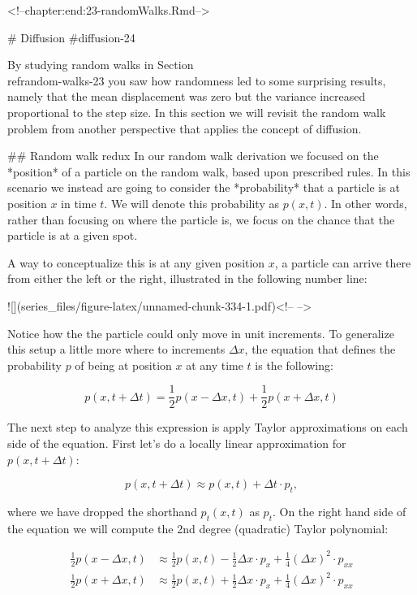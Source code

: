 \documentclass[
]{book}
\theoremstyle{definition}
\theoremstyle{definition}
\theoremstyle{definition}
\theoremstyle{remark}
\begin{document}
<!--chapter:end:23-randomWalks.Rmd-->

# Diffusion {#diffusion-24}

By studying random walks in Section \\ref{random-walks-23} you saw how randomness led to some surprising results, namely that the mean displacement was zero but the variance increased proportional to the step size.  In this section we will revisit the random walk problem from another perspective that applies the concept of diffusion.

## Random walk redux
In our random walk derivation we focused on the *position* of a particle on the random walk, based upon prescribed rules.  In this scenario we instead are going to consider the *probability* that a particle is at position $x$ in time $t$. We will denote this probability as $p(x,t)$. In other words, rather than focusing on where the particle is, we focus on the chance that the particle is at a given spot.

A way to conceptualize this is at any given position $x$, a particle can arrive there from either the left or the right, illustrated in the following number line:

![](series_files/figure-latex/unnamed-chunk-334-1.pdf)<!-- --> 

Notice how the the particle could only move in unit increments. To generalize this setup a little more where to increments $\Delta x$, the equation that defines the probability $p$ of being at position $x$ at any time $t$ is the following:

\begin{equation}
p(x,t+\Delta t) = \frac{1}{2} p(x-\Delta x,t) + \frac{1}{2} p(x+\Delta x,t) \label{eq:master-diff}
\end{equation}

The next step to analyze this expression is apply Taylor approximations on each side of the equation.  First let’s do a locally linear approximation for $p(x,t+\Delta t)$:

\begin{equation}
p(x,t+\Delta t)  \approx p(x,t) + \Delta t \cdot p_{t},
\end{equation}

where we have dropped the shorthand $p_{t}(x,t)$ as $p_{t}$.  On the right hand side of the equation we will compute the 2nd degree (quadratic) Taylor polynomial:

\begin{align*}
\frac{1}{2} p(x-\Delta x,t)  & \approx \frac{1}{2} p(x,t) -   \frac{1}{2} \Delta x \cdot p_{x} + \frac{1}{4} (\Delta x)^{2}\cdot  p_{xx} \\
\frac{1}{2} p(x+\Delta x,t)  & \approx \frac{1}{2} p(x,t) +   \frac{1}{2} \Delta x \cdot p_{x} + \frac{1}{4} (\Delta x)^{2} \cdot p_{xx}
\end{align*}
\end{document}

